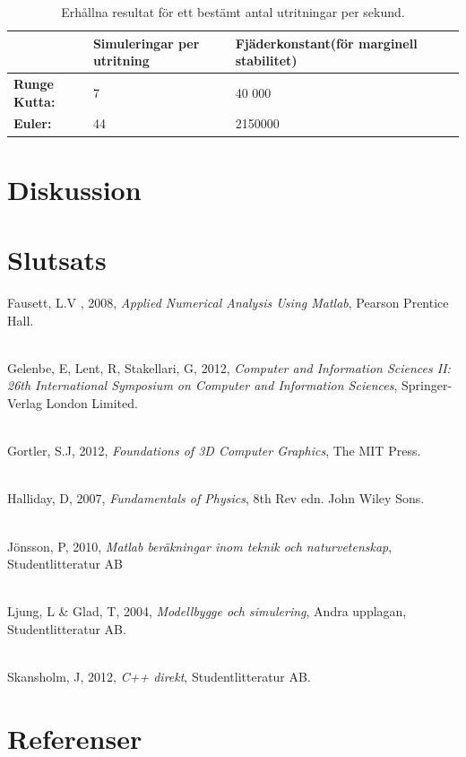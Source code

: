 \documentclass[a4paper,12pt,oneside,final,swedish]{extarticle}
\begin{document}
\begin{table}[htbp]
    \caption{Erhållna resultat för ett bestämt antal utritningar per sekund.}
    \label{table_example2}
    \begin{tabular*}{\hsize}{lllll}
      \hline %
       & \bfseries Simuleringar per utritning & \bfseries Fjäderkonstant(för marginell stabilitet)\\
      \hline
      \bfseries Runge Kutta: & 7 & 40 000\\
      \bfseries Euler: & 44 & 2150000\\
      \hline
    \end{tabular*}
\end{table}
\section{Diskussion}


\section{Slutsats}
Fausett, L.V , 2008, \textit{Applied Numerical Analysis Using Matlab}, Pearson Prentice Hall.

\noindent \\Gelenbe, E, Lent, R, Stakellari, G, 2012, \textit{Computer and Information Sciences II: 26th International Symposium on Computer and Information Sciences}, Springer-Verlag London Limited.

\noindent \\Gortler, S.J, 2012, \textit{Foundations of 3D Computer Graphics}, The MIT Press.

\noindent \\Halliday, D, 2007, \textit{Fundamentals of Physics}, 8th Rev edn. John Wiley Sons.

\noindent \\Jönsson, P, 2010, \textit{Matlab beräkningar inom teknik och naturvetenskap}, Studentlitteratur AB

\noindent \\Ljung, L \& Glad, T, 2004, \textit{Modellbygge och simulering}, Andra upplagan, Studentlitteratur AB.

\noindent \\Skansholm, J, 2012, \textit{C++ direkt}, Studentlitteratur AB.



\section{Referenser}
\end{document}
